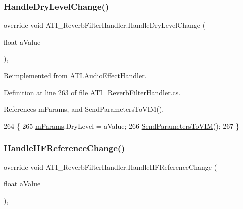 \subsubsection{\texorpdfstring{Handle\+Dry\+Level\+Change()}{HandleDryLevelChange()}}
{\footnotesize\ttfamily override void A\+T\+I\+\_\+\+Reverb\+Filter\+Handler.\+Handle\+Dry\+Level\+Change (\begin{DoxyParamCaption}\item[{float}]{a\+Value }\end{DoxyParamCaption})\hspace{0.3cm}{\ttfamily [protected]}, {\ttfamily [virtual]}}



Reimplemented from \hyperlink{class_a_t_i_1_1_audio_effect_handler_abf6b4a6ead7e60bbaea15f94936c316e}{A\+T\+I.\+Audio\+Effect\+Handler}.



Definition at line 263 of file A\+T\+I\+\_\+\+Reverb\+Filter\+Handler.\+cs.



References m\+Params, and Send\+Parameters\+To\+V\+I\+M().


\begin{DoxyCode}
264     \{
265         \hyperlink{class_a_t_i___reverb_filter_handler_a034260fbce2052b42bceddc891632347}{mParams}.DryLevel = aValue;
266         \hyperlink{class_a_t_i___reverb_filter_handler_aacb469dc3038fca616d638f6a5a04a30}{SendParametersToVIM}();
267     \}
\end{DoxyCode}
\mbox{\label{class_a_t_i___reverb_filter_handler_a4cb8ab454ef637beb189053a0877c8c6}} 
\subsubsection{\texorpdfstring{Handle\+H\+F\+Reference\+Change()}{HandleHFReferenceChange()}}
{\footnotesize\ttfamily override void A\+T\+I\+\_\+\+Reverb\+Filter\+Handler.\+Handle\+H\+F\+Reference\+Change (\begin{DoxyParamCaption}\item[{float}]{a\+Value }\end{DoxyParamCaption})\hspace{0.3cm}{\ttfamily [protected]}, {\ttfamily [virtual]}}



